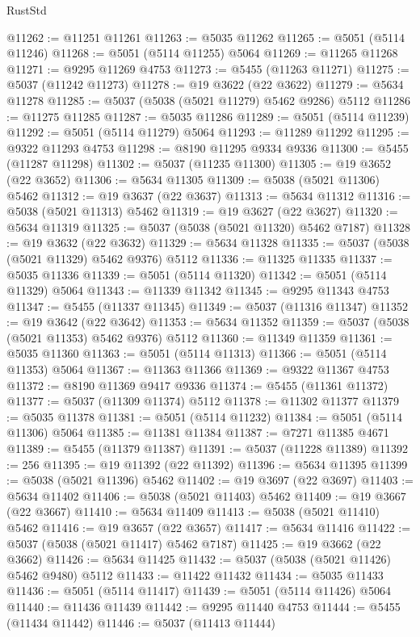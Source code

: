 \begin{lexlean}{RustStd}
\begin{coremodule}
@11262 := @11251 @11261
@11263 := @5035 @11262
@11265 := @5051 (@5114 @11246)
@11268 := @5051 (@5114 @11255) @5064
@11269 := @11265 @11268
@11271 := @9295 @11269 @4753
@11273 := @5455 (@11263 @11271)
@11275 := @5037 (@11242 @11273)
@11278 := @19 @3622 (@22 @3622)
@11279 := @5634 @11278
@11285 := @5037 (@5038 (@5021 @11279) @5462 @9286) @5112
@11286 := @11275 @11285
@11287 := @5035 @11286
@11289 := @5051 (@5114 @11239)
@11292 := @5051 (@5114 @11279) @5064
@11293 := @11289 @11292
@11295 := @9322 @11293 @4753
@11298 := @8190 @11295 @9334 @9336
@11300 := @5455 (@11287 @11298)
@11302 := @5037 (@11235 @11300)
@11305 := @19 @3652 (@22 @3652)
@11306 := @5634 @11305
@11309 := @5038 (@5021 @11306) @5462
@11312 := @19 @3637 (@22 @3637)
@11313 := @5634 @11312
@11316 := @5038 (@5021 @11313) @5462
@11319 := @19 @3627 (@22 @3627)
@11320 := @5634 @11319
@11325 := @5037 (@5038 (@5021 @11320) @5462 @7187)
@11328 := @19 @3632 (@22 @3632)
@11329 := @5634 @11328
@11335 := @5037 (@5038 (@5021 @11329) @5462 @9376) @5112
@11336 := @11325 @11335
@11337 := @5035 @11336
@11339 := @5051 (@5114 @11320)
@11342 := @5051 (@5114 @11329) @5064
@11343 := @11339 @11342
@11345 := @9295 @11343 @4753
@11347 := @5455 (@11337 @11345)
@11349 := @5037 (@11316 @11347)
@11352 := @19 @3642 (@22 @3642)
@11353 := @5634 @11352
@11359 := @5037 (@5038 (@5021 @11353) @5462 @9376) @5112
@11360 := @11349 @11359
@11361 := @5035 @11360
@11363 := @5051 (@5114 @11313)
@11366 := @5051 (@5114 @11353) @5064
@11367 := @11363 @11366
@11369 := @9322 @11367 @4753
@11372 := @8190 @11369 @9417 @9336
@11374 := @5455 (@11361 @11372)
@11377 := @5037 (@11309 @11374) @5112
@11378 := @11302 @11377
@11379 := @5035 @11378
@11381 := @5051 (@5114 @11232)
@11384 := @5051 (@5114 @11306) @5064
@11385 := @11381 @11384
@11387 := @7271 @11385 @4671
@11389 := @5455 (@11379 @11387)
@11391 := @5037 (@11228 @11389)
@11392 := 256
@11395 := @19 @11392 (@22 @11392)
@11396 := @5634 @11395
@11399 := @5038 (@5021 @11396) @5462
@11402 := @19 @3697 (@22 @3697)
@11403 := @5634 @11402
@11406 := @5038 (@5021 @11403) @5462
@11409 := @19 @3667 (@22 @3667)
@11410 := @5634 @11409
@11413 := @5038 (@5021 @11410) @5462
@11416 := @19 @3657 (@22 @3657)
@11417 := @5634 @11416
@11422 := @5037 (@5038 (@5021 @11417) @5462 @7187)
@11425 := @19 @3662 (@22 @3662)
@11426 := @5634 @11425
@11432 := @5037 (@5038 (@5021 @11426) @5462 @9480) @5112
@11433 := @11422 @11432
@11434 := @5035 @11433
@11436 := @5051 (@5114 @11417)
@11439 := @5051 (@5114 @11426) @5064
@11440 := @11436 @11439
@11442 := @9295 @11440 @4753
@11444 := @5455 (@11434 @11442)
@11446 := @5037 (@11413 @11444)

\end{coremodule}
\end{lexlean}
